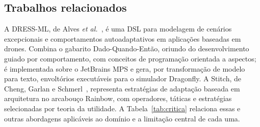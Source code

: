 \documentclass[conference]{IEEEtran}
\begin{document}
\subsection{Trabalhos relacionados}
\label{sec:relacionados}

A DRESS-ML, de Alves \textit{et al.}~\cite{alves2022}, é uma DSL para modelagem
de cenários excepcionais e comportamentos autoadaptativos em aplicações
baseadas em drones. Combina o gabarito Dado-Quando-Então, oriundo do
desenvolvimento guiado por comportamento, com conceitos de programação
orientada a aspectos; é implementada sobre o JetBrains MPS e gera, por
transformação de modelo para texto, envoltórios executáveis para o simulador
Dragonfly. A Stitch, de Cheng, Garlan e Schmerl~\cite{cheng2012}, representa
estratégias de adaptação baseada em arquitetura no arcabouço Rainbow, com
operadores, táticas e estratégias selecionadas por teoria da utilidade. A
Tabela~\ref{tab:critica} relaciona essas e outras abordagens aplicáveis ao
domínio e a limitação central de cada uma.
\end{document}
